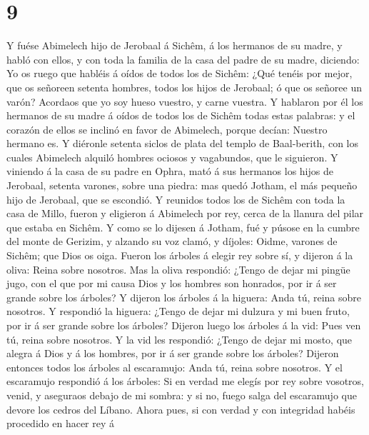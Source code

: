 \hypertarget{section-8}{%
\section{9}\label{section-8}}

 Y fuése Abimelech hijo de Jerobaal á Sichêm, á los hermanos
de su madre, y habló con ellos, y con toda la familia de la casa del
padre de su madre, diciendo:  Yo os ruego que habléis á
oídos de todos los de Sichêm: ¿Qué tenéis por mejor, que os señoreen
setenta hombres, todos los hijos de Jerobaal; ó que os señoree un varón?
Acordaos que yo soy hueso vuestro, y carne vuestra.  Y
hablaron por él los hermanos de su madre á oídos de todos los de Sichêm
todas estas palabras: y el corazón de ellos se inclinó en favor de
Abimelech, porque decían: Nuestro hermano es.  Y diéronle
setenta siclos de plata del templo de Baal-berith, con los cuales
Abimelech alquiló hombres ociosos y vagabundos, que le siguieron.
 Y viniendo á la casa de su padre en Ophra, mató á sus
hermanos los hijos de Jerobaal, setenta varones, sobre una piedra: mas
quedó Jotham, el más pequeño hijo de Jerobaal, que se escondió.
 Y reunidos todos los de Sichêm con toda la casa de Millo,
fueron y eligieron á Abimelech por rey, cerca de la llanura del pilar
que estaba en Sichêm.  Y como se lo dijesen á Jotham, fué y
púsose en la cumbre del monte de Gerizim, y alzando su voz clamó, y
díjoles: Oidme, varones de Sichêm; que Dios os oiga.  Fueron
los árboles á elegir rey sobre sí, y dijeron á la oliva: Reina sobre
nosotros.  Mas la oliva respondió: ¿Tengo de dejar mi pingüe
jugo, con el que por mi causa Dios y los hombres son honrados, por ir á
ser grande sobre los árboles?  Y dijeron los árboles á la
higuera: Anda tú, reina sobre nosotros.  Y respondió la
higuera: ¿Tengo de dejar mi dulzura y mi buen fruto, por ir á ser grande
sobre los árboles?  Dijeron luego los árboles á la vid:
Pues ven tú, reina sobre nosotros.  Y la vid les respondió:
¿Tengo de dejar mi mosto, que alegra á Dios y á los hombres, por ir á
ser grande sobre los árboles?  Dijeron entonces todos los
árboles al escaramujo: Anda tú, reina sobre nosotros.  Y el
escaramujo respondió á los árboles: Si en verdad me elegís por rey sobre
vosotros, venid, y aseguraos debajo de mi sombra: y si no, fuego salga
del escaramujo que devore los cedros del Líbano.  Ahora
pues, si con verdad y con integridad habéis procedido en hacer rey á
